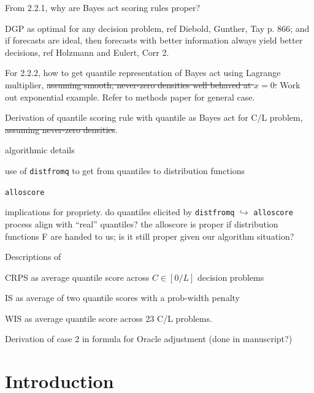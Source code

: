 \documentclass{article}\usepackage[]{graphicx}\usepackage[]{xcolor}
\newcommand{\cmark}{\ding{51}}%
\newcommand{\xmark}{\ding{55}}%
\newcommand{\done}{\rlap{$\square$}{\raisebox{2pt}{\large\hspace{1pt}\cmark}}%
\hspace{-2.5pt}}
\begin{document}
\begin{todolist}
	\item[\done] From 2.2.1, why are Bayes act scoring rules proper?
	\item DGP as optimal for any decision problem, ref Diebold, Gunther, Tay p. 866; and if forecasts are ideal, then forecasts with better information always yield better decisions, ref Holzmann and Eulert, Corr 2.
	\item[\done] For 2.2.2, how to get quantile representation of Bayes act using Lagrange multiplier, \st{assuming smooth, never-zero densities well behaved at $x=0$.} Work out exponential example. Refer to methods paper for general case.
	\item[\done] Derivation of quantile scoring rule with quantile as Bayes act for C/L problem, \st{assuming never-zero densities}. 
	\item algorithmic details
	\begin{todolist}
		\item use of \texttt{distfromq} to get from quantiles to distribution functions
		\item \texttt{alloscore}
		\item implications for propriety. do quantiles elicited by \texttt{distfromq} $\hookrightarrow$ \texttt{alloscore} process align with ``real'' quantiles? the alloscore is proper if distribution functions F are handed to us; is it still proper given our algorithm situation?
	\end{todolist}

	\item Descriptions of 
		\begin{todolist}		
			\item CRPS as average quantile score across $C \in [0/L]$ decision problems
			\item IS as average of two quantile scores with a prob-width penalty
			\item WIS as average quantile score across 23 C/L problems.
		\end{todolist}
	\item[\xmark]  Derivation of case 2 in formula for Oracle adjustment (done in manuscript?)
\end{todolist}

\section{Introduction}
\label{sec:intro}
\end{document}
